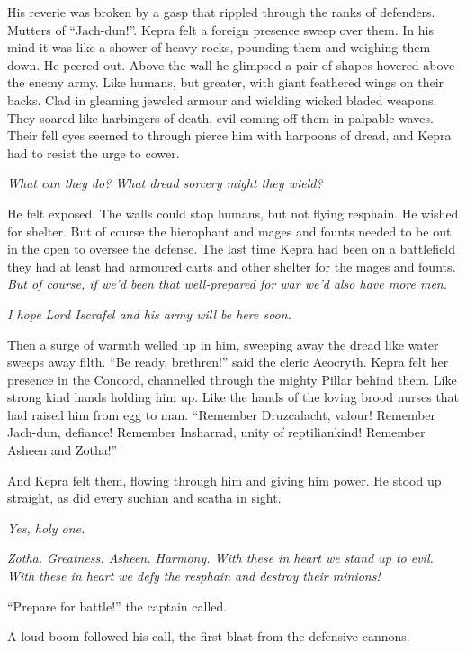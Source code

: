 \documentclass
  [a4paper,
   12pt,
   oneside
  ]%
  {article}
\begin{document}
His reverie was broken by a gasp that rippled through the ranks of defenders. 
Mutters of ``Jach-dun!''. 
Kepra felt a foreign presence sweep over them.
In his mind it was like a shower of heavy rocks, pounding them and weighing them down. 
He peered out. 
Above the wall he glimpsed a pair of shapes hovered above the enemy army.
Like humans, but greater, with giant feathered wings on their backs. 
Clad in gleaming jeweled armour and wielding wicked bladed weapons. 
They soared like harbingers of death, evil coming off them in palpable waves. 
Their fell eyes seemed to through pierce him with harpoons of dread, and Kepra had to resist the urge to cower. 

\emph{What can they do? What dread sorcery might they wield?} 

He felt exposed. 
The walls could stop humans, but not flying resphain. 
He wished for shelter.
But of course the hierophant and mages and founts needed to be out in the open to oversee the defense. 
The last time Kepra had been on a battlefield they had at least had armoured carts and other shelter for the mages and founts. 
\emph{But of course, if we'd been that well-prepared for war we'd also have more men.}

\emph{I hope Lord Iscrafel and his army will be here soon.}

Then a surge of warmth welled up in him, sweeping away the dread like water sweeps away filth. 
``Be ready, brethren!'' said the cleric Aeocryth. 
Kepra felt her presence in the Concord, channelled through the mighty Pillar behind them. 
Like strong kind hands holding him up. 
Like the hands of the loving brood nurses that had raised him from egg to man.
``Remember Druzcalacht, valour! Remember Jach-dun, defiance! Remember Insharrad, unity of reptiliankind! Remember Asheen and Zotha!'' 

And Kepra felt them, flowing through him and giving him power. He stood up straight, as did every suchian and scatha in sight. 

\emph{Yes, holy one.}

\emph{Zotha. Greatness. Asheen. Harmony. With these in heart we stand up to evil. With these in heart we defy the resphain and destroy their minions!}

``Prepare for battle!'' the captain called.

A loud boom followed his call, the first blast from the defensive cannons. 
\end{document}

